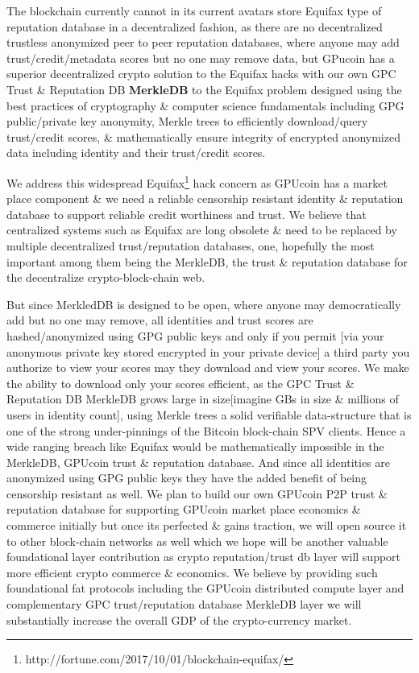 The blockchain currently cannot in its current avatars store Equifax type of reputation database in a decentralized fashion, as there are no decentralized trustless anonymized peer to peer reputation databases, where anyone may add trust/credit/metadata scores but no one may remove data, but GPucoin has a superior decentralized crypto solution to the Equifax hacks with our own GPC Trust \& Reputation DB \textbf{MerkleDB} to the Equifax problem designed using the best practices of cryptography \& computer science fundamentals including GPG public/private key anonymity, Merkle trees to efficiently download/query trust/credit scores, \& mathematically ensure integrity of encrypted anonymized data including identity and their trust/credit scores.

We address this widespread Equifax\footnote{http://fortune.com/2017/10/01/blockchain-equifax/} hack concern as GPUcoin has a market place component \& we need a reliable censorship resistant identity \& reputation database to support reliable credit worthiness and trust. We believe that centralized systems such as Equifax are long obsolete \& need to be replaced by multiple decentralized trust/reputation databases, one, hopefully the most important among them being the MerkleDB, the trust \& reputation database for the decentralize crypto-block-chain web. 

But since MerkledDB is designed to be open, where anyone may democratically add but no one may remove, all identities and trust scores are hashed/anonymized using GPG public keys and only if you permit [via your anonymous private key stored encrypted in your private device] a third party you authorize to view your scores may they download and view your scores. We make the ability to download only your scores efficient, as the GPC Trust \& Reputation DB MerkleDB grows large in size[imagine GBs in size \& millions of users in identity count], using Merkle trees a solid verifiable data-structure that is one of the strong under-pinnings of the Bitcoin block-chain SPV clients. Hence a wide ranging breach like Equifax would be mathematically impossible in the MerkleDB, GPUcoin trust \& reputation database.
And since all identities are anonymized using GPG public keys they have the added benefit of being censorship resistant as well. We plan to build our own GPUcoin P2P trust \& reputation database for supporting GPUcoin market place economics \& commerce initially but once its perfected \& gains traction, we will open source it to other block-chain networks as well which we hope will be another valuable foundational layer contribution as crypto reputation/trust db layer will support more efficient crypto commerce \& economics. We believe by providing such foundational fat protocols including the GPUcoin distributed compute layer and complementary GPC trust/reputation database MerkleDB layer we will substantially increase the overall GDP of the crypto-currency market.
